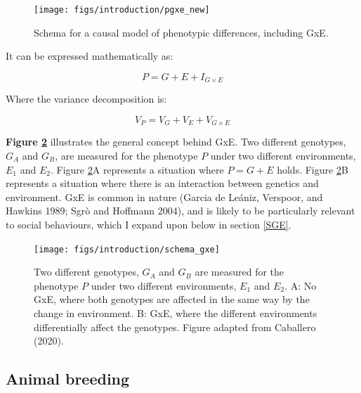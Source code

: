 \documentclass[
]{book}
\begin{document}
\begin{figure}

{\centering \texttt{[image: figs/introduction/pgxe\_new]} 

}

\caption{Schema for a causal model of phenotypic differences, including GxE.}\label{fig:pgxe}
\end{figure}

It can be expressed mathematically as:

\begin{equation}
P = G + E + I_{G\times E} \label{eq:gbye}
\end{equation}

Where the variance decomposition is:

\begin{equation}
V_P = V_G + V_E + V_{G\times E} \label{eq:gbyedecomp}
\end{equation}

\textbf{Figure \ref{fig:schema-gxe}} illustrates the general concept behind GxE. Two different genotypes, \(G_A\) and \(G_B\), are measured for the phenotype \(P\) under two different environments, \(E_1\) and \(E_2\). Figure \ref{fig:schema-gxe}A represents a situation where \(P = G + E\) holds. Figure \ref{fig:schema-gxe}B represents a situation where there is an interaction between genetics and environment. GxE is common in nature (Garcia de Leániz, Verspoor, and Hawkins 1989; Sgrò and Hoffmann 2004), and is likely to be particularly relevant to social behaviours, which I expand upon below in section \ref{SGE}.



\begin{figure}

{\centering \texttt{[image: figs/introduction/schema\_gxe]} 

}

\caption{Two different genotypes, \(G_A\) and \(G_B\) are measured for the phenotype \(P\) under two different environments, \(E_1\) and \(E_2\). A: No GxE, where both genotypes are affected in the same way by the change in environment. B: GxE, where the different environments differentially affect the genotypes. Figure adapted from Caballero (2020).}\label{fig:schema-gxe}
\end{figure}

\hypertarget{animal-breeding}{%
\subsection{Animal breeding}\label{animal-breeding}}
\end{document}
